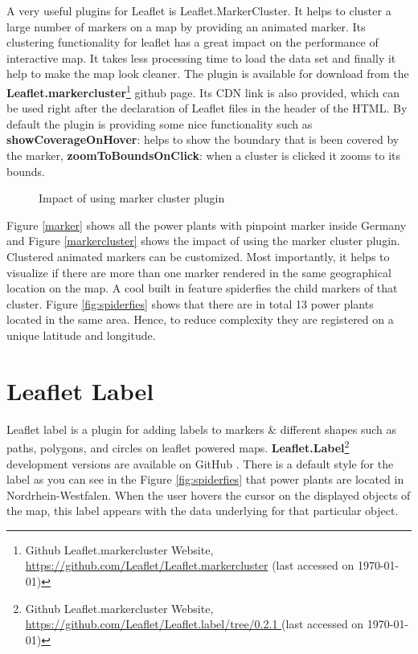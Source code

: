 A very useful plugins for Leaflet is Leaflet.MarkerCluster. It helps to cluster a large number of markers on a map by providing an animated marker. Its clustering functionality for leaflet has a great impact on the performance of interactive map. It takes less processing time to load the data set and finally it help to make the map look cleaner. The plugin is available for download from the \textbf{Leaflet.markercluster}\footnote{Github Leaflet.markercluster Website, \url{https://github.com/Leaflet/Leaflet.markercluster} (last accessed on \today)} github page. Its CDN link is also provided, which can be used right after the declaration of Leaflet files in the header of the HTML. By default the plugin is providing some nice functionality such as \textbf{showCoverageOnHover}: helps to show the boundary that is been covered by the marker, \textbf{zoomToBoundsOnClick}: when a cluster is clicked it zooms to its bounds.

\begin{figure}[H]
  \begin{center}
\hfill
{}
\hfill
\caption{Impact of using marker cluster plugin}
\end{center}
\end{figure}

Figure \ref{marker} shows all the power plants with pinpoint marker inside Germany and Figure \ref{markercluster} shows the impact of using the marker cluster plugin. Clustered animated markers can be customized. Most importantly, it helps to visualize if there are more than one marker rendered in the same geographical location on the map. A cool built in feature spiderfies the child markers of that cluster. Figure \ref{fig:spiderfies} shows that there are in total 13 power plants located in the same area. Hence, to reduce complexity they are registered on a unique latitude and longitude.

\section*{Leaflet Label}

Leaflet label is a plugin for adding labels to markers \& different shapes such as paths, polygons, and circles on leaflet powered maps. \textbf{Leaflet.Label}\footnote{Github Leaflet.markercluster Website, \url{https://github.com/Leaflet/Leaflet.label/tree/0.2.1
} (last accessed on {\today})} development versions are available on GitHub . There is a default style for the label as you can see in the Figure \ref{fig:spiderfies} that power plants are located in Nordrhein-Westfalen. When the user hovers the cursor on the displayed objects of the map, this label appears with the data underlying for that particular object.

